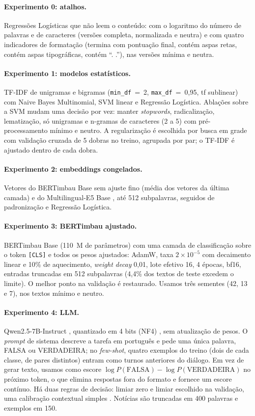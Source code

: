 \paragraph{Experimento 0: atalhos.} Regressões Logísticas que não leem o conteúdo: com o logaritmo do número de palavras e de caracteres (versões completa, normalizada e neutra) e com quatro indicadores de formatação (termina com pontuação final, contém aspas retas, contém aspas tipográficas, contém ``. .''), nas versões mínima e neutra.

\paragraph{Experimento 1: modelos estatísticos.} TF-IDF de unigramas e bigramas (\texttt{min\_df}~=~2, \texttt{max\_df}~=~0,95, tf sublinear) com Naive Bayes Multinomial, SVM linear e Regressão Logística. Ablações sobre a SVM mudam uma decisão por vez: manter \emph{stopwords}, radicalização, lematização, só unigramas e n-gramas de caracteres (2 a 5) com pré-processamento mínimo e neutro. A regularização é escolhida por busca em grade com validação cruzada de 5 dobras no treino, agrupada por par; o TF-IDF é ajustado dentro de cada dobra.

\paragraph{Experimento 2: embeddings congelados.} Vetores do BERTimbau Base sem ajuste fino (média dos vetores da última camada) e do Multilingual-E5 Base \citep{wang2024e5}, até 512 subpalavras, seguidos de padronização e Regressão Logística.

\paragraph{Experimento 3: BERTimbau ajustado.} BERTimbau Base (110~M de parâmetros) com uma camada de classificação sobre o token \texttt{[CLS]} e todos os pesos ajustados: AdamW, taxa $2\times10^{-5}$ com decaimento linear e 10\% de aquecimento, \emph{weight decay} 0,01, lote efetivo 16, 4 épocas, bf16, entradas truncadas em 512 subpalavras (4,4\% dos textos de teste excedem o limite). O melhor ponto na validação é restaurado. Usamos três sementes (42, 13 e 7), nos textos mínimo e neutro.

\paragraph{Experimento 4: LLM.} Qwen2.5-7B-Instruct \citep{qwen2025}, quantizado em 4 bits (NF4) \citep{dettmers2023}, sem atualização de pesos. O \emph{prompt} de sistema descreve a tarefa em português e pede uma única palavra, FALSA ou VERDADEIRA; no \emph{few-shot}, quatro exemplos do treino (dois de cada classe, de pares distintos) entram como turnos anteriores do diálogo. Em vez de gerar texto, usamos como escore $\log P(\textrm{FALSA}) - \log P(\textrm{VERDADEIRA})$ no próximo token, o que elimina respostas fora do formato e fornece um escore contínuo. Há duas regras de decisão: limiar zero e limiar escolhido na validação, uma calibração contextual simples \citep{zhao2021}. Notícias são truncadas em 400 palavras e exemplos em 150.

